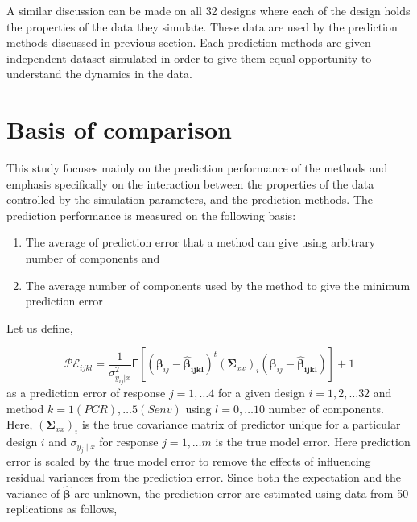 \documentclass[12pt,3p,authoryear]{elsarticle}
\providecommand{\tightlist}{%
  \setlength{\itemsep}{0pt}\setlength{\parskip}{0pt}}
\begin{document}
A similar discussion can be made on all 32 designs where each of the
design holds the properties of the data they simulate. These data are
used by the prediction methods discussed in previous section. Each
prediction methods are given independent dataset simulated in order to
give them equal opportunity to understand the dynamics in the data.

\hypertarget{basis-of-comparison}{%
\section{Basis of comparison}\label{basis-of-comparison}}

This study focuses mainly on the prediction performance of the methods
and emphasis specifically on the interaction between the properties of
the data controlled by the simulation parameters, and the prediction
methods. The prediction performance is measured on the following basis:

\begin{enumerate}
\def\labelenumi{\alph{enumi})}
\tightlist
\item
  The average of prediction error that a method can give using arbitrary
  number of components and
\item
  The average number of components used by the method to give the
  minimum prediction error
\end{enumerate}

Let us define,

\begin{equation}
\mathcal{PE}_{ijkl} = \frac{1}{\sigma_{y_{ij}|x}^2}
  \mathsf{E}{\left[\left(\boldsymbol{\beta}_{ij} - 
  \boldsymbol{\hat{\beta}_{ijkl}}\right)^t
  \left(\boldsymbol{\Sigma}_{xx}\right)_i
  \left(\boldsymbol{\beta}_{ij} - \boldsymbol{\hat{\beta}_{ijkl}}\right)\right]} + 1
\label{eq:pred-error}
\end{equation} as a prediction error of response \(j = 1, \ldots 4\) for
a given design \(i=1, 2, \ldots 32\) and method
\(k=1(PCR), \ldots 5(Senv)\) using \(l=0, \ldots 10\) number of
components. Here, \(\left(\boldsymbol{\Sigma}_{xx}\right)_i\) is the
true covariance matrix of predictor unique for a particular design \(i\)
and \(\sigma_{y_j\mid x}\) for response \(j = 1, \ldots m\) is the true
model error. Here prediction error is scaled by the true model error to
remove the effects of influencing residual variances from the prediction
error. Since both the expectation and the variance of
\(\hat{\boldsymbol{\beta}}\) are unknown, the prediction error are
estimated using data from 50 replications as follows,
\end{document}
